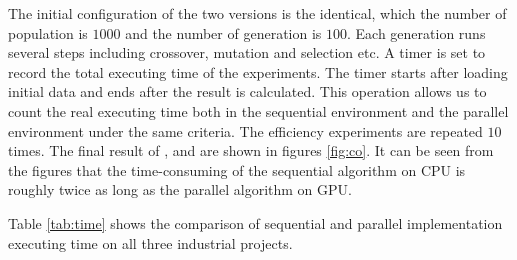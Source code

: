 The initial configuration of the two versions is the identical, which the number
of population is $1000$ and the number of generation is $100$. Each generation
runs several steps including crossover, mutation and selection etc. A timer is
set to record the total executing time of the experiments. The timer starts
after loading initial data and ends after the result is calculated. This
operation allows us to count the real executing time both in the sequential
environment and the parallel environment under the same criteria.
The efficiency experiments are repeated $10$ times.  The final result of
\projectA{}, \projectB{} and \projectC{} are shown in figures \ref{fig:co}. It
can be seen from the figures that the time-consuming of the sequential algorithm
on CPU is roughly twice as long as the parallel algorithm on GPU.

Table
\ref{tab:time} shows the comparison of sequential and parallel implementation
executing time on all three industrial projects.

